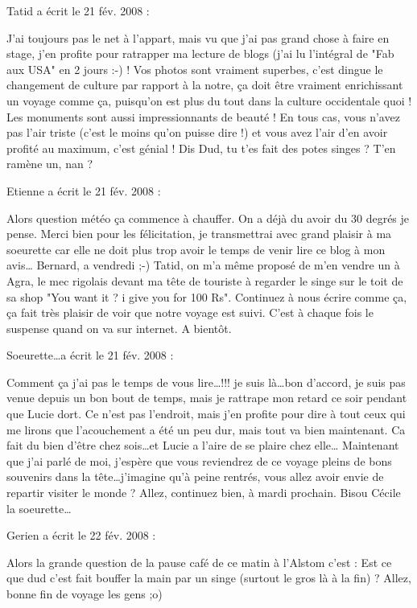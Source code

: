 \medskip
Tatid a écrit le 21 fév. 2008 :
\begin{displayquote}
J'ai toujours pas le net à l'appart, mais vu que j'ai pas grand chose à faire en stage, j'en profite pour ratrapper ma lecture de blogs (j'ai lu l'intégral de "Fab aux USA" en 2 jours :-) !
Vos photos sont vraiment superbes, c'est dingue le changement de culture par rapport à la notre, ça doit être vraiment enrichissant un voyage comme ça, puisqu'on est plus du tout dans la culture occidentale quoi ! Les monuments sont aussi impressionnants de beauté ! En tous cas, vous n'avez pas l'air triste (c'est le moins qu'on puisse dire !) et vous avez l'air d'en avoir profité au maximum, c'est génial !
Dis Dud, tu t'es fait des potes singes ? T'en ramène un, nan ?
\end{displayquote}

\medskip
Etienne a écrit le 21 fév. 2008 :
\begin{displayquote}
Alors question météo ça commence à chauffer. On a déjà du avoir du 30 degrés je pense. Merci bien pour les félicitation, je transmettrai avec grand plaisir à ma soeurette car elle ne doit plus trop avoir le temps de venir lire ce blog à mon avis\dots
Bernard, a vendredi ;-)
Tatid, on m'a même proposé de m'en vendre un à Agra, le mec rigolais devant ma tête de touriste à regarder le singe sur le toit de sa shop "You want it ? i give you for 100 Rs".
Continuez à nous écrire comme ça, ça fait très plaisir de voir que notre voyage est suivi. C'est à chaque fois le suspense quand on va sur internet. A bientôt.
\end{displayquote}

\medskip
Soeurette\dots a écrit le 21 fév. 2008 :
\begin{displayquote}
Comment ça j'ai pas le temps de vous lire\dots !!! je suis là\dots bon d'accord, je suis pas venue depuis un bon bout de temps, mais je rattrape mon retard ce soir pendant que Lucie dort.
Ce n'est pas l'endroit, mais j'en profite pour dire à tout ceux  qui me lirons que l'acouchement a été un peu dur, mais tout va bien maintenant. Ca fait du bien d'être chez sois\dots et Lucie a l'aire de se plaire chez elle\dots
Maintenant que j'ai parlé de moi, j'espère que vous reviendrez de ce voyage pleins de bons souvenirs dans la tête\dots j'imagine qu'à peine rentrés, vous allez avoir envie de repartir visiter le monde ?
Allez, continuez bien, à mardi prochain.
Bisou
Cécile la soeurette\dots
\end{displayquote}

\medskip
Gerien a écrit le 22 fév. 2008 :
\begin{displayquote}
Alors la grande question de la pause café de ce matin à l'Alstom c'est :
Est ce que dud c'est fait bouffer la main par un singe (surtout le gros là à la fin) ?
Allez, bonne fin de voyage les gens ;o)
\end{displayquote}

